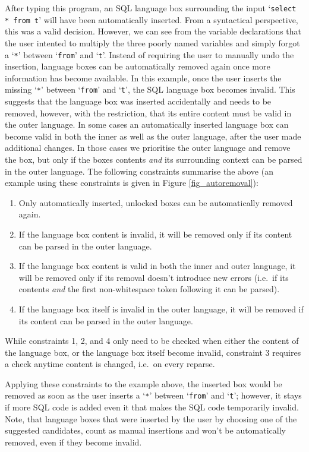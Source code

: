 \documentclass[sigplan,screen]{acmart}\settopmatter{printfolios=true,printccs=false,printacmref=false}
\newcommand{\qtt}[1]{`\texttt{#1}'\xspace}
\begin{document}
After typing this program, an SQL language box surrounding the input
\qtt{select * from t} will have been automatically inserted. From a syntactical
perspective, this was a valid decision. However, we can see from the variable
declarations that the user intented to multiply the three poorly named
variables and simply forgot a \qtt{*} between \qtt{from} and \qtt{t}.
Instead of requiring the user to manually undo the insertion, language boxes
can be automatically removed again once more information has
become available.  In this example, once the user inserts the missing \qtt{*}
between \qtt{from} and \qtt{t}, the SQL language box becomes invalid. This
suggests that the language box was inserted accidentally and needs
to be removed, however, with the restriction, that its entire content must be valid in
the outer language.
In some cases an automatically inserted language box can become valid in
both the inner as well as the outer language, after the user made additional
changes.  In those cases we prioritise the outer language and remove the
box, but only if the boxes contents \emph{and} its surrounding context can be
parsed in the outer language. The following constraints summarise the above
(an example using these constraints is given in Figure \ref{fig_autoremoval}):
\begin{enumerate}
  \item Only automatically inserted, unlocked boxes can be automatically removed again.
  \item If the language box content is invalid, it will be removed only if
        its content can be parsed in the outer language.
  \item If the language box content is valid in both the inner and outer
    language, it will be removed only if its removal doesn't introduce new errors (i.e.~if its contents \emph{and} the first non-whitespace token following it
    can be parsed).
  \item If the language box itself is invalid in the outer language, it will be removed
      if its content can be parsed in the outer language.
\end{enumerate}

While constraints 1, 2, and 4 only need to be checked when either the content of
the language box, or the language box itself become invalid, constraint 3 requires
a check anytime content is changed, i.e.~on every reparse.

Applying these constraints to the example above, the inserted box would be
removed as soon as the user inserts a \qtt{*} between \qtt{from} and
\qtt{t}; however, it stays if more SQL code is added even it that makes the
SQL code temporarily invalid. Note, that language boxes that were inserted by the
user by choosing one of the suggested candidates, count as manual insertions
and won't be automatically removed, even if they become invalid.
\end{document}
